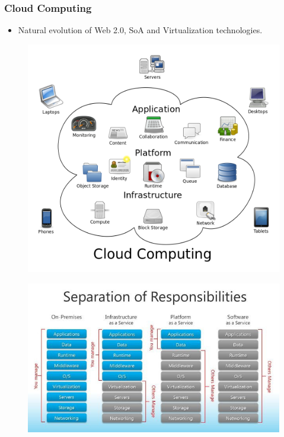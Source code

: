 \documentclass{beamer}
\begin{document}
\begin{frame}
  \frametitle{Cloud Computing}
  \begin{itemize}
  \item Natural evolution of Web 2.0, SoA and Virtualization
    technologies. 
  \end{itemize}

  \begin{figure}[Cloud]
    \includegraphics[width=\textwidth,height=0.8\textheight,keepaspectratio]{Cloud_computing.png}
  \end{figure}
\end{frame}

\begin{frame}
  \begin{figure}
    \includegraphics[width=\textwidth,height=0.8\textheight,keepaspectratio]{cloud_sep_of_resp.jpg}
  \end{figure}
\end{frame}
\end{document}
